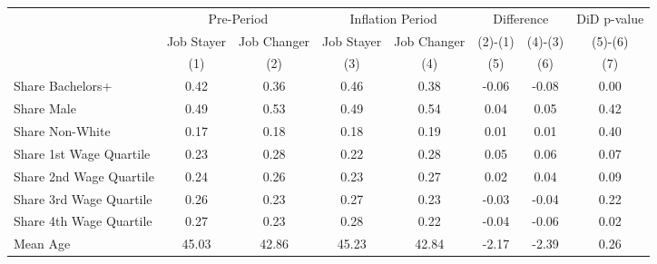 \begin{table}[htbp]
\centering
\setlength{\tabcolsep}{5pt}
\begin{tabular}{lccccccc}
\toprule
\toprule
& \multicolumn{2}{c}{Pre-Period} & \multicolumn{2}{c}{Inflation Period} & \multicolumn{2}{c}{Difference} & \multicolumn{1}{c}{DiD p-value} \\
\cmidrule(lr){2-3} \cmidrule(lr){4-5} \cmidrule(lr){6-7} \cmidrule(lr){8-8} 
& Job Stayer & Job Changer& Job Stayer & Job Changer & (2)-(1) & (4)-(3) & (5)-(6) \\
& (1) & (2) & (3) & (4) & (5) & (6) & (7) \\
\midrule
Share Bachelors+          & 0.42 & 0.36 & 0.46 & 0.38 & -0.06 & -0.08 & 0.00 \\
Share Male                & 0.49 & 0.53 & 0.49 & 0.54 &  0.04 &  0.05 & 0.42 \\
Share Non-White           & 0.17 & 0.18 & 0.18 & 0.19 &  0.01 &  0.01 & 0.40 \\
Share 1st Wage Quartile   & 0.23 & 0.28 & 0.22 & 0.28 &  0.05 &  0.06 & 0.07 \\
Share 2nd Wage Quartile   & 0.24 & 0.26 & 0.23 & 0.27 &  0.02 &  0.04 & 0.09 \\
Share 3rd Wage Quartile   & 0.26 & 0.23 & 0.27 & 0.23 & -0.03 & -0.04 & 0.22 \\
Share 4th Wage Quartile   & 0.27 & 0.23 & 0.28 & 0.22 & -0.04 & -0.06 & 0.02 \\
Mean Age                  & 45.03 & 42.86 & 45.23 & 42.84 & -2.17 & -2.39 & 0.26 \\
\bottomrule
\bottomrule
\end{tabular}

\vspace{0.5em}
\end{table}